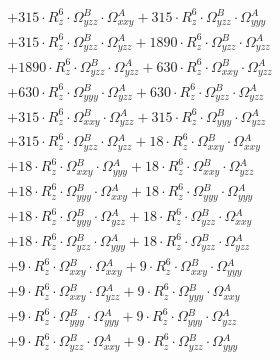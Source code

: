 \documentclass{article}
\begin{document}
\begin{subequations}
\begin{gather}
\begin{array}{c}
 \\[0.2em] 		 + 315 \cdot R_{z}^{6} \cdot \Omega{}^{B}_{yzz} \cdot \Omega{}^{A}_{xxy}+ 315 \cdot R_{z}^{6} \cdot \Omega{}^{B}_{yzz} \cdot \Omega{}^{A}_{yyy} 
 \\[0.2em] 		 + 315 \cdot R_{z}^{6} \cdot \Omega{}^{B}_{yzz} \cdot \Omega{}^{A}_{yzz}+ 1890 \cdot R_{z}^{6} \cdot \Omega{}^{B}_{yzz} \cdot \Omega{}^{A}_{yzz} 
 \\[0.2em] 		 + 1890 \cdot R_{z}^{6} \cdot \Omega{}^{B}_{yzz} \cdot \Omega{}^{A}_{yzz}+ 630 \cdot R_{z}^{6} \cdot \Omega{}^{B}_{xxy} \cdot \Omega{}^{A}_{yzz} 
 \\[0.2em] 		 + 630 \cdot R_{z}^{6} \cdot \Omega{}^{B}_{yyy} \cdot \Omega{}^{A}_{yzz}+ 630 \cdot R_{z}^{6} \cdot \Omega{}^{B}_{yzz} \cdot \Omega{}^{A}_{yzz} 
 \\[0.2em] 		 + 315 \cdot R_{z}^{6} \cdot \Omega{}^{B}_{xxy} \cdot \Omega{}^{A}_{yzz}+ 315 \cdot R_{z}^{6} \cdot \Omega{}^{B}_{yyy} \cdot \Omega{}^{A}_{yzz} 
 \\[0.2em] 		 + 315 \cdot R_{z}^{6} \cdot \Omega{}^{B}_{yzz} \cdot \Omega{}^{A}_{yzz}+ 18 \cdot R_{z}^{6} \cdot \Omega{}^{B}_{xxy} \cdot \Omega{}^{A}_{xxy} 
 \\[0.2em] 		 + 18 \cdot R_{z}^{6} \cdot \Omega{}^{B}_{xxy} \cdot \Omega{}^{A}_{yyy}+ 18 \cdot R_{z}^{6} \cdot \Omega{}^{B}_{xxy} \cdot \Omega{}^{A}_{yzz} 
 \\[0.2em] 		 + 18 \cdot R_{z}^{6} \cdot \Omega{}^{B}_{yyy} \cdot \Omega{}^{A}_{xxy}+ 18 \cdot R_{z}^{6} \cdot \Omega{}^{B}_{yyy} \cdot \Omega{}^{A}_{yyy} 
 \\[0.2em] 		 + 18 \cdot R_{z}^{6} \cdot \Omega{}^{B}_{yyy} \cdot \Omega{}^{A}_{yzz}+ 18 \cdot R_{z}^{6} \cdot \Omega{}^{B}_{yzz} \cdot \Omega{}^{A}_{xxy} 
 \\[0.2em] 		 + 18 \cdot R_{z}^{6} \cdot \Omega{}^{B}_{yzz} \cdot \Omega{}^{A}_{yyy}+ 18 \cdot R_{z}^{6} \cdot \Omega{}^{B}_{yzz} \cdot \Omega{}^{A}_{yzz} 
 \\[0.2em] 		 + 9 \cdot R_{z}^{6} \cdot \Omega{}^{B}_{xxy} \cdot \Omega{}^{A}_{xxy}+ 9 \cdot R_{z}^{6} \cdot \Omega{}^{B}_{xxy} \cdot \Omega{}^{A}_{yyy} 
 \\[0.2em] 		 + 9 \cdot R_{z}^{6} \cdot \Omega{}^{B}_{xxy} \cdot \Omega{}^{A}_{yzz}+ 9 \cdot R_{z}^{6} \cdot \Omega{}^{B}_{yyy} \cdot \Omega{}^{A}_{xxy} 
 \\[0.2em] 		 + 9 \cdot R_{z}^{6} \cdot \Omega{}^{B}_{yyy} \cdot \Omega{}^{A}_{yyy}+ 9 \cdot R_{z}^{6} \cdot \Omega{}^{B}_{yyy} \cdot \Omega{}^{A}_{yzz} 
 \\[0.2em] 		 + 9 \cdot R_{z}^{6} \cdot \Omega{}^{B}_{yzz} \cdot \Omega{}^{A}_{xxy}+ 9 \cdot R_{z}^{6} \cdot \Omega{}^{B}_{yzz} \cdot \Omega{}^{A}_{yyy} 

\end{array}
\end{gather}
\end{subequations}
\end{document}
